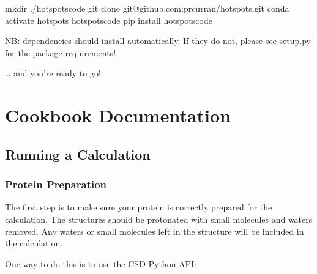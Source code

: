 \documentclass[letterpaper,10pt,english]{sphinxmanual}
\begin{document}
\begin{sphinxVerbatim}[commandchars=\\\{\}]
mkdir ./hotspots\PYGZus{}code
git clone git@github.com:prcurran/hotspots.git
conda activate hotspots
 hotspots\PYGZus{}code
pip install hotspots\PYGZus{}code
\end{sphinxVerbatim}

NB: dependencies should install automatically. If they do not, please see setup.py for the package requirements!

… and you’re ready to go!


\chapter{Cookbook Documentation}
\label{\detokenize{tutorial:cookbook-documentation}}

\section{Running a Calculation}
\label{\detokenize{tutorial:running-a-calculation}}

\subsection{Protein Preparation}
\label{\detokenize{tutorial:protein-preparation}}
The first step is to make sure your protein is correctly prepared for the calculation. The structures should be
protonated with small molecules and waters removed. Any waters or small molecules left in the structure will be included
in the calculation.

One way to do this is to use the CSD Python API:

\begin{sphinxVerbatim}[commandchars=\\\{\}]
   

  
   
\end{sphinxVerbatim}
\end{document}
